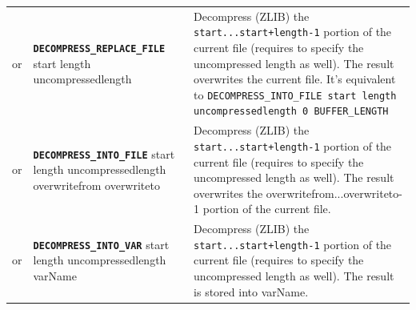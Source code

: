 \documentclass{article}
\def\DEFINE#1{{\tt \bf #1}\label{#1}\index{#1}}
\begin{document}
\begin{tabular}{cp{10in}|p{10in}}
or & \DEFINE{DECOMPRESS_REPLACE_FILE} start length uncompressedlength &
	Decompress (ZLIB) the \verb/start...start+length-1/ portion of the current
	file (requires to specify the uncompressed length as well). The result overwrites
	the current file. It's equivalent to
	\verb+DECOMPRESS_INTO_FILE start length uncompressedlength 0 BUFFER_LENGTH+
\\
or & \DEFINE{DECOMPRESS_INTO_FILE} start length uncompressedlength overwritefrom
  overwriteto &
	Decompress (ZLIB) the \verb/start...start+length-1/ portion of the current
	file (requires to specify the uncompressed length as well). The result overwrites
	the overwritefrom...overwriteto-1 portion of the current file.
\\
or & \DEFINE{DECOMPRESS_INTO_VAR} start length uncompressedlength varName &
	Decompress (ZLIB) the \verb/start...start+length-1/ portion of the current
	file (requires to specify the uncompressed length as well). The result is stored
	into varName.
\\


\end{tabular}
\end{document}
